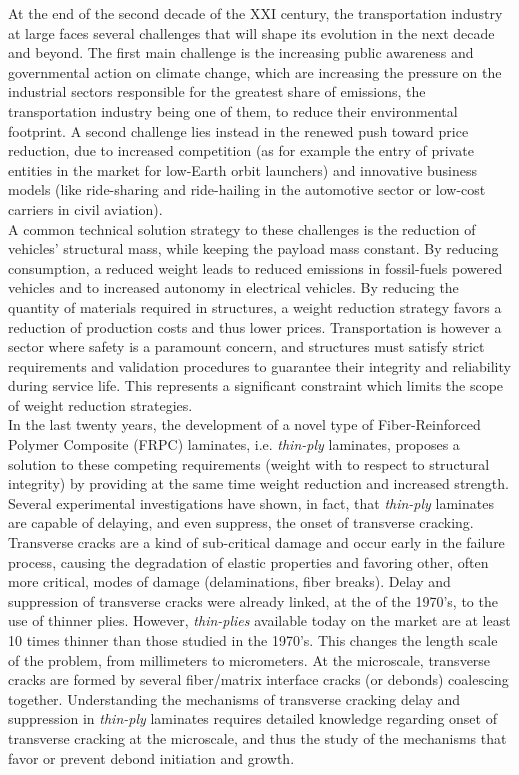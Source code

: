 At the end of the second decade of the XXI century, the transportation industry at large faces several challenges that will shape its evolution in the next decade and beyond. The first main challenge is the increasing public awareness and governmental action on climate change, which are increasing the pressure on the industrial sectors responsible for the greatest share of emissions, the transportation industry being one of them, to reduce their environmental footprint. A second challenge lies instead in the renewed push toward price reduction, due to increased competition (as for example the entry of private entities in the market for low-Earth orbit launchers) and innovative business models (like ride-sharing and ride-hailing in the automotive sector or low-cost carriers in civil aviation).\\
A common technical solution strategy to these challenges is the reduction of vehicles' structural mass, while keeping the payload mass constant. By reducing consumption, a reduced weight leads to reduced emissions in fossil-fuels powered vehicles and to increased autonomy in electrical vehicles. By reducing the quantity of materials required in structures, a weight reduction strategy favors a reduction of production costs and thus lower prices. Transportation is however a sector where safety is a paramount concern, and structures must satisfy strict requirements and validation procedures to guarantee their integrity and reliability during service life. This represents a significant constraint which limits the scope of weight reduction strategies.\\
In the last twenty years, the development of a novel type of Fiber-Reinforced Polymer Composite (FRPC) laminates, i.e. \emph{thin-ply} laminates, proposes a solution to these competing requirements (weight with to respect to structural integrity) by providing at the same time weight reduction and increased strength. Several experimental investigations have shown, in fact, that \emph{thin-ply} laminates are capable of delaying, and even suppress, the onset of transverse cracking. Transverse cracks are a kind of sub-critical damage and occur early in the failure process, causing the degradation of elastic properties and favoring other, often more critical, modes of damage (delaminations, fiber breaks). Delay and suppression of transverse cracks were already linked, at the of the 1970's, to the use of thinner plies. However, \emph{thin-plies} available today on the market are at least 10 times thinner than those studied in the 1970's. This changes the length scale of the problem, from millimeters to micrometers. At the microscale, transverse cracks are formed by several fiber/matrix interface cracks (or debonds) coalescing together. Understanding the mechanisms of transverse cracking delay and suppression in \emph{thin-ply} laminates requires detailed knowledge regarding onset of transverse cracking at the microscale, and thus the study of the mechanisms that favor or prevent debond initiation and growth.\\
